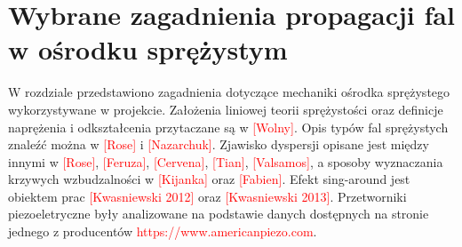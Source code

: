 \chapter{Wybrane zagadnienia propagacji fal w ośrodku sprężystym}
\label{cha:wybrane_zagadnienia_propagacji_fal_w_osrodku_sprezystym}

W rozdziale przedstawiono zagadnienia dotyczące mechaniki ośrodka sprężystego wykorzystywane w projekcie. Założenia liniowej teorii sprężystości oraz definicje naprężenia i odkształcenia przytaczane są w \textcolor{red}{[Wolny]}. Opis typów fal sprężystych znaleźć można w \textcolor{red}{[Rose]} i \textcolor{red}{[Nazarchuk]}. Zjawisko dyspersji opisane jest między innymi w \textcolor{red}{[Rose]}, \textcolor{red}{[Feruza]}, \textcolor{red}{[Cervena]}, \textcolor{red}{[Tian]}, \textcolor{red}{[Valsamos]}, a sposoby wyznaczania krzywych wzbudzalności w \textcolor{red}{[Kijanka]} oraz \textcolor{red}{[Fabien]}. Efekt sing-around jest obiektem prac \textcolor{red}{[Kwasniewski 2012]} oraz \textcolor{red}{[Kwasniewski 2013]}. Przetworniki piezoeletryczne były analizowane na podstawie danych dostępnych na stronie jednego z producentów \textcolor{red}{https://www.americanpiezo.com}.





























